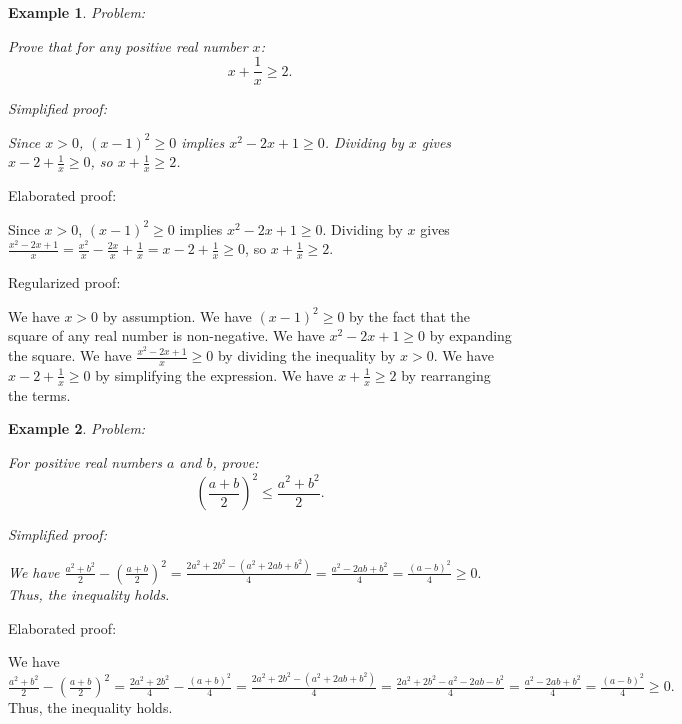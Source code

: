 \documentclass{article}
\newtheorem{example}{Example}
\begin{document}
\begin{example}
Problem:
\begin{tcolorbox}[colback=yellow!10, width=\linewidth]
Prove that for any positive real number $x$:
    $$x + \frac{1}{x} \geq 2.$$
\end{tcolorbox}

Simplified proof:
\begin{tcolorbox}[colback=blue!10, width=\linewidth]
Since $x>0$, $(x-1)^2 \ge 0$ implies $x^2 - 2x + 1 \ge 0$. Dividing by $x$ gives $x - 2 + \frac{1}{x} \ge 0$, so $x + \frac{1}{x} \ge 2$.
\end{tcolorbox}
\end{example}

Elaborated proof:
\begin{tcolorbox}[colback=green!10, width=\linewidth]
Since $x>0$, $(x-1)^2 \ge 0$ implies $x^2 - 2x + 1 \ge 0$. Dividing by $x$ gives $\frac{x^2 - 2x + 1}{x} = \frac{x^2}{x} - \frac{2x}{x} + \frac{1}{x}= x - 2 + \frac{1}{x} \ge 0$, so $x + \frac{1}{x} \ge 2$.
\end{tcolorbox}

Regularized proof:
\begin{tcolorbox}[colback=red!10, width=\linewidth]
We have $x > 0$ by assumption.
We have $(x-1)^2 \ge 0$ by the fact that the square of any real number is non-negative.
We have $x^2 - 2x + 1 \ge 0$ by expanding the square.
We have $\frac{x^2 - 2x + 1}{x} \ge 0$ by dividing the inequality by $x > 0$.
We have $x - 2 + \frac{1}{x} \ge 0$ by simplifying the expression.
We have $x + \frac{1}{x} \ge 2$ by rearranging the terms.
\end{tcolorbox}



\begin{example}
Problem:
\begin{tcolorbox}[colback=yellow!10, width=\linewidth]
For positive real numbers $a$ and $b$, prove:
    $$\left(\frac{a+b}{2}\right)^2 \leq \frac{a^2+b^2}{2}.$$
\end{tcolorbox}

Simplified proof:
\begin{tcolorbox}[colback=blue!10, width=\linewidth]
We have
$ \frac{a^2+b^2}{2} - \left(\frac{a+b}{2}\right)^2 = \frac{2a^2+2b^2-(a^2+2ab+b^2)}{4} = \frac{a^2-2ab+b^2}{4} = \frac{(a-b)^2}{4} \ge 0. $
Thus, the inequality holds.
\end{tcolorbox}
\end{example}

Elaborated proof:
\begin{tcolorbox}[colback=green!10, width=\linewidth]
We have
$ \frac{a^2+b^2}{2} - \left(\frac{a+b}{2}\right)^2 = \frac{2a^2+2b^2}{4} - \frac{(a+b)^2}{4} = \frac{2a^2+2b^2-(a^2+2ab+b^2)}{4} = \frac{2a^2+2b^2-a^2-2ab-b^2}{4} = \frac{a^2-2ab+b^2}{4} = \frac{(a-b)^2}{4} \ge 0. $
Thus, the inequality holds.
\end{tcolorbox}
\end{document}
